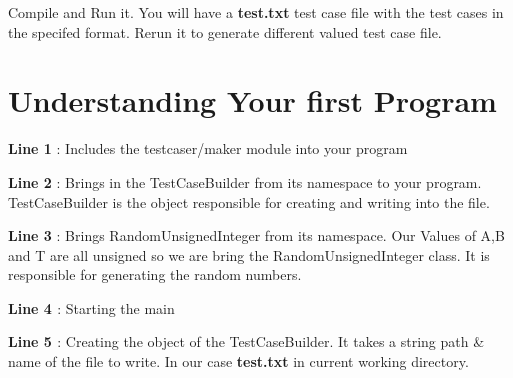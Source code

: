 \begin{DoxyCode}{0}
\DoxyCodeLine{\textcolor{preprocessor}{\#include <testcaser/maker>}}
\DoxyCodeLine{}
\DoxyCodeLine{}
\DoxyCodeLine{}
\DoxyCodeLine{}
\DoxyCodeLine{ \}}
\DoxyCodeLine{\}}
\end{DoxyCode}


Compile and Run it. You will have a {\bfseries{test.\+txt}} test case file with the test cases in the specifed format. Rerun it to generate different valued test case file.\hypertarget{index_under_standing}{}\section{Understanding Your first Program}\label{index_under_standing}
{\bfseries{Line 1}} \+: Includes the testcaser/maker module into your program

{\bfseries{Line 2}} \+: Brings in the Test\+Case\+Builder from its namespace to your program. Test\+Case\+Builder is the object responsible for creating and writing into the file.

{\bfseries{Line 3}} \+: Brings Random\+Unsigned\+Integer from its namespace. Our Values of A,B and T are all unsigned so we are bring the Random\+Unsigned\+Integer class. It is responsible for generating the random numbers.

{\bfseries{Line 4 }} \+: Starting the main

{\bfseries{Line 5 }} \+: Creating the object of the Test\+Case\+Builder. It takes a string path \& name of the file to write. In our case {\bfseries{test.\+txt}} in current working directory.

